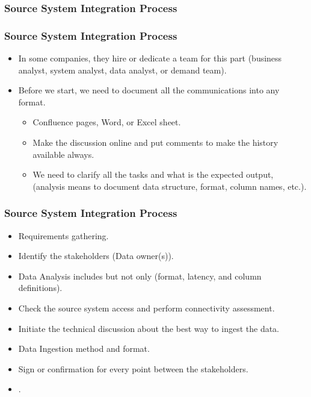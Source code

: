 \subsubsection{Source System Integration Process}
\begin{frame}
    \frametitle{Source System Integration Process}
    \begin{itemize}[<+->]
        \item In some companies, they hire or dedicate a team for this part (business analyst, system analyst, data analyst, or demand team).
        \item Before we start, we need to document all the communications into any format.
		\begin{itemize}
            \item Confluence pages, Word, or Excel sheet.
            \item Make the discussion online and put comments to make the history available always.
			\item We need to clarify all the tasks and what is the expected output, \forexample (analysis means to document data structure, format, column names, etc.).
        \end{itemize}
    \end{itemize}

\end{frame}

\begin{frame}
    \frametitle{Source System Integration Process}
    \begin{itemize}[<+->]
        \item  Requirements gathering. %
        \item  Identify the stakeholders (Data owner(s)).
        \item  Data Analysis includes but not only (format, latency, and column definitions).
        \item  Check the source system access and perform connectivity assessment.
        \item  Initiate the technical discussion about the best way to ingest the data.
        \item  Data Ingestion method and format.
        \item  Sign or confirmation for every point between the stakeholders.
        \item  {}.
    \end{itemize}

\end{frame}


